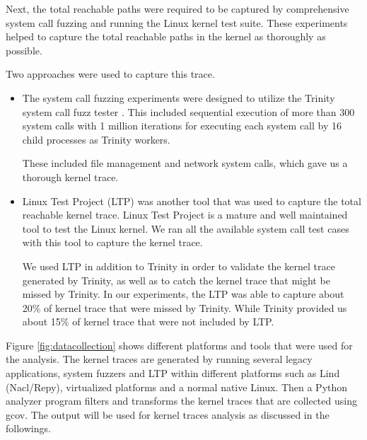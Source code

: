 Next, the total reachable paths were required to be captured by comprehensive system call fuzzing and running the Linux kernel test suite. These experiments helped to capture the total reachable paths in the kernel as thoroughly as possible. 

Two approaches were used to capture this trace.

\begin{itemize}
\item The system call fuzzing experiments were designed to utilize the Trinity system call fuzz tester \cite{Trinity}. This included sequential execution of more than 300 system calls with 1 million iterations for executing each system call by 16 child processes as Trinity workers.

These included file management and network system calls,  which gave us a thorough kernel trace. 

\item Linux Test Project (LTP) \cite{LTP} was another tool that was used to capture the total reachable kernel trace.
Linux Test Project is a mature and well maintained tool to test the Linux
kernel. 
We ran all the available system call test cases with this tool to capture
the kernel trace. 

We used LTP in addition to Trinity in order to validate the kernel trace generated 
by Trinity, as well as to catch the kernel trace that might be missed by Trinity. 
In our experiments, the LTP was able to capture about 20\% of kernel trace 
that were missed by Trinity. While Trinity provided us about 15\% of kernel trace 
that were not included by LTP. 
\end{itemize}

Figure \ref{fig:datacollection} shows different platforms and tools that were used for the analysis. The kernel traces are generated by running several legacy applications, system fuzzers and LTP within different platforms such as Lind (Nacl/Repy), virtualized platforms and a normal native Linux. Then a Python analyzer program filters and transforms the kernel traces that are collected using gcov. The output will be used for kernel traces analysis as discussed in the followings.

